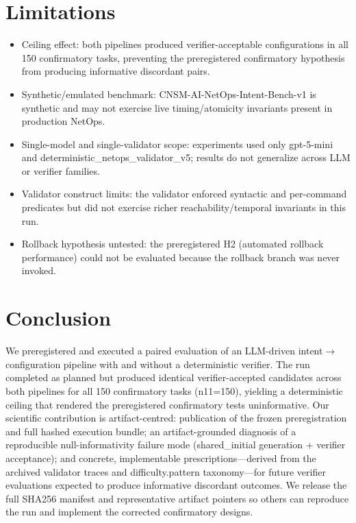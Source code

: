 \documentclass[conference]{IEEEtran}
\begin{document}
\section{Limitations}
\begin{itemize}
\item Ceiling effect: both pipelines produced verifier-acceptable configurations in all 150 confirmatory tasks, preventing the preregistered confirmatory hypothesis from producing informative discordant pairs.
\item Synthetic/emulated benchmark: CNSM-AI-NetOps-Intent-Bench-v1 is synthetic and may not exercise live timing/atomicity invariants present in production NetOps.
\item Single-model and single-validator scope: experiments used only gpt-5-mini and deterministic\_netops\_validator\_v5; results do not generalize across LLM or verifier families.
\item Validator construct limits: the validator enforced syntactic and per-command predicates but did not exercise richer reachability/temporal invariants in this run.
\item Rollback hypothesis untested: the preregistered H2 (automated rollback performance) could not be evaluated because the rollback branch was never invoked.
\end{itemize}

\section{Conclusion}
We preregistered and executed a paired evaluation of an LLM-driven intent\ensuremath{\rightarrow}configuration pipeline with and without a deterministic verifier. The run completed as planned but produced identical verifier-accepted candidates across both pipelines for all 150 confirmatory tasks (n11=150), yielding a deterministic ceiling that rendered the preregistered confirmatory tests uninformative. Our scientific contribution is artifact-centred: publication of the frozen preregistration and full hashed execution bundle; an artifact-grounded diagnosis of a reproducible null-informativity failure mode (shared\_initial generation + verifier acceptance); and concrete, implementable prescriptions---derived from the archived validator traces and difficulty.pattern taxonomy---for future verifier evaluations expected to produce informative discordant outcomes. We release the full SHA256 manifest and representative artifact pointers so others can reproduce the run and implement the corrected confirmatory designs.
\end{document}
